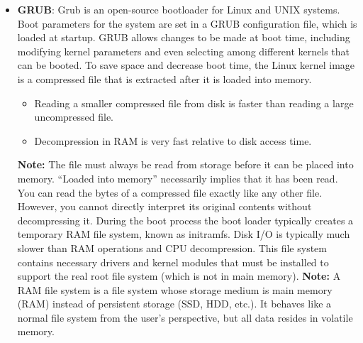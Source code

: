 \documentclass{report}
\begin{document}
\begin{itemize}
            \bigbreak \noindent 
            Whether booting from BIOS or UEFI, the boot loader can perform a variety of tasks. In addition to loading the file containing the kernel program into memory, it also runs diagnostics to determine the state of the machine. If the diagnostics pass, the program can continue with the booting steps.
            \bigbreak \noindent 
            The bootloader can also initialize all aspects of the system, from CPU registers to device controllers and the contents of main memory. 
            \bigbreak \noindent 
            Sooner or later, it starts the operating system and mounts the root file system. At this point the system is said to be running.
        \item \textbf{GRUB}: Grub is an open-source bootloader for Linux and UNIX systems. Boot parameters for the system are set in a GRUB configuration file, which is loaded at startup.
            \bigbreak \noindent 
            GRUB allows changes to be made at boot time, including modifying kernel parameters and even selecting among different kernels that can be booted. To save space and decrease boot time, the Linux kernel image is a compressed file that is extracted after it is loaded into memory.
            \bigbreak \noindent 
            \begin{itemize}
                \item Reading a smaller compressed file from disk is faster than reading a large uncompressed file.
                \item Decompression in RAM is very fast relative to disk access time.
            \end{itemize}
            \textbf{Note:} The file must always be read from storage before it can be placed into memory. “Loaded into memory” necessarily implies that it has been read. You can read the bytes of a compressed file exactly like any other file. However, you cannot directly interpret its original contents without decompressing it.
            \bigbreak \noindent 
            During the boot process the boot loader typically creates a temporary RAM file system, known as initramfs. Disk I/O is typically much slower than RAM operations and CPU decompression. This file system contains necessary drivers and kernel modules that must be installed to support the real root file system (which is not in main memory).
            \bigbreak \noindent 
            \textbf{Note:} A RAM file system is a file system whose storage medium is main memory (RAM) instead of persistent storage (SSD, HDD, etc.). It behaves like a normal file system from the user’s perspective, but all data resides in volatile memory.

\end{itemize}
\end{document}
